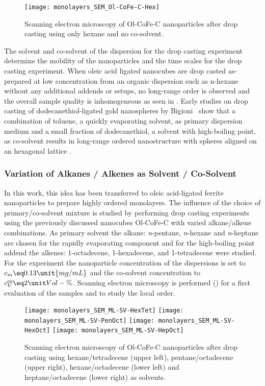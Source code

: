 \documentclass[\main/dresen_thesis.tex]{subfiles}
\begin{document}
  \begin{figure}[tb]
    \centering
    \texttt{[image: monolayers\_SEM\_Ol-CoFe-C-Hex]}
    \caption{\label{fig:monolayers:preparation:solventVariation:semNoCoSolvent}Scanning electron microscopy of Ol-CoFe-C nanoparticles after drop casting using only hexane and no co-solvent.}
  \end{figure}
  The solvent and co-solvent of the dispersion for the drop casting experiment determine the mobility of the nanoparticles and the time scales for the drop casting experiment.
  When oleic acid ligated nanocubes are drop casted as-prepared at low concentration from an organic dispersion such as n-hexane without any additional addends or setups, no long-range order is observed and the overall sample quality is inhomogeneous as seen in .
  Early studies on drop casting of dodecanethiol-ligated gold nanospheres by Bigioni \etal \, show that a combination of toluene, a quickly evaporating solvent, as primary dispersion medium and a small fraction of dodecanethiol, a solvent with high-boiling point, as co-solvent results in long-range ordered nanostructure with spheres aligned on an hexagonal lattice \cite{Bigioni_2006_Kinet}.

  \subsubsection{Variation of Alkanes / Alkenes as Solvent / Co-Solvent}
    In this work, this idea has been transferred to oleic acid-ligated ferrite nanoparticles to prepare highly ordered monolayers.
    The influence of the choice of primary/co-solvent mixture is studied by performing drop casting experiments using the previously discussed nanocubes Ol-CoFe-C with varied alkane/alkene combinations.
    As primary solvent the alkane: \textit{n}-pentane, \textit{n}-hexane and \textit{n}-heptane are chosen for the rapidly evaporating component and for the high-boiling point addend the alkenes: 1-octadecene, 1-hexadecene, and 1-tetradecene were studied.
    For the experiment the nanoparticle concentration of the dispersions is set to $c_m \eq 0.13 \unit{mg/mL}$ and the co-solvent concentration to $c_V^\textsf{co} \eq 2\unit{Vol-\%}$.
    Scanning electron microscopy is performed () for a first evaluation of the samples and to study the local order.

    \begin{figure}[tb]
      \centering
      \texttt{[image: monolayers\_SEM\_ML-SV-HexTet]}
      \texttt{[image: monolayers\_SEM\_ML-SV-PenOct]}
      \texttt{[image: monolayers\_SEM\_ML-SV-HexOct]}
      \texttt{[image: monolayers\_SEM\_ML-SV-HepOct]}
      \caption{\label{fig:monolayers:preparation:solventVariation:sem}Scanning electron microscopy of Ol-CoFe-C nanoparticles after drop casting using hexane/tetradecene (upper left),  pentane/octadecene (upper right), hexane/octadecene (lower left) and heptane/octadecene (lower right) as solvents.}
    \end{figure}
\end{document}
